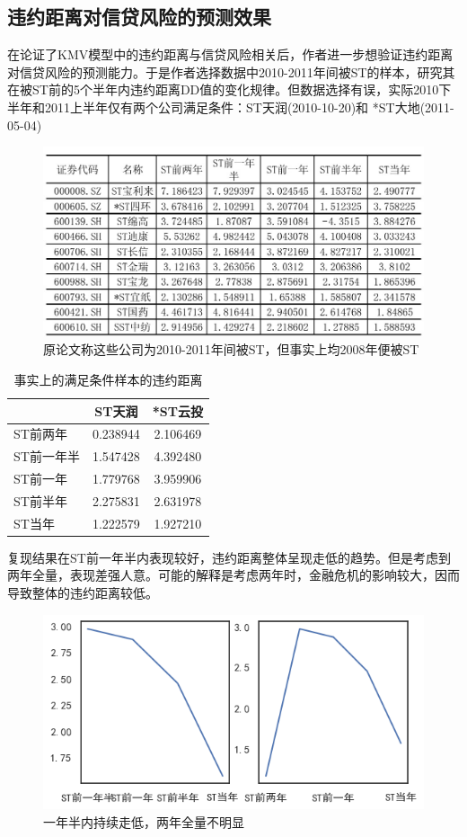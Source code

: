 \documentclass[a4paper,12pt]{ctexart}
\begin{document}
\subsection{违约距离对信贷风险的预测效果}
在论证了KMV模型中的违约距离与信贷风险相关后，作者进一步想验证违约距离对信贷风险的预测能力。于是作者选择数据中2010-2011年间被ST的样本，研究其在被ST前的5个半年内违约距离DD值的变化规律。但数据选择有误，实际2010下半年和2011上半年仅有两个公司满足条件：ST天润(2010-10-20)和 *ST大地(2011-05-04)
\begin{figure}[H]
    \includegraphics[width=\linewidth]{img/dd_origin.jpeg}
    \caption{原论文称这些公司为2010-2011年间被ST，但事实上均2008年便被ST}
\end{figure}
\begin{table}[H]
    \centering
    \begin{tabular}{lcc}
        \toprule
               & ST天润     & *ST云投    \\
        \midrule
        ST前两年  & 0.238944 & 2.106469 \\
        ST前一年半 & 1.547428 & 4.392480 \\
        ST前一年  & 1.779768 & 3.959906 \\
        ST前半年  & 2.275831 & 2.631978 \\
        ST当年   & 1.222579 & 1.927210 \\
        \bottomrule
    \end{tabular}
    \caption{事实上的满足条件样本的违约距离}
\end{table}

复现结果在ST前一年半内表现较好，违约距离整体呈现走低的趋势。但是考虑到两年全量，表现差强人意。可能的解释是考虑两年时，金融危机的影响较大，因而导致整体的违约距离较低。
\begin{figure}[H]
    \includegraphics[width=\linewidth]{img/st.png}
    \caption{一年半内持续走低，两年全量不明显}
\end{figure}
\end{document}
